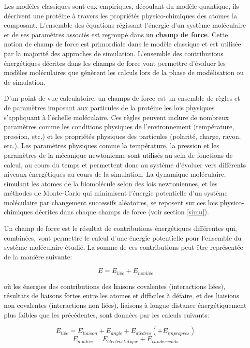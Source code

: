  \label{forcefield}

Les modèles classiques sont eux empiriques, découlant du modèle quantique, ils décrivent une protéine à travers les propriétés physico-chimiques des atomes la composant. L'ensemble des équations régissant l'énergie d'un système moléculaire et de ses paramètres associés est regroupé dans un \textbf{champ de force}. Cette notion de champ de force est primordiale dans le modèle classique et est utilisée par la majorité des approches de simulation. L'ensemble des contributions énergétiques décrites dans les champs de force vont permettre d'évaluer les modèles moléculaires que génèrent les calculs lors de la phase de modélisation ou de simulation.

D'un point de vue calculatoire, un champs de force est un ensemble de règles et de paramètres imposant aux particules de la protéine les lois physiques s'appliquant à l'échelle moléculaire. Ces règles peuvent inclure de nombreux paramètres comme les conditions physiques de l'environnement (température, pression, etc.) et les propriétés physiques des particules (polarité, charge, rayon, etc.). Les paramètres physiques comme la température, la pression et les paramètres de la mécanique newtonienne sont utilisés au sein de fonctions de calcul, au cours du temps et permettent donc au système d'évoluer vers différents niveaux énergétiques au cours de la simulation. La dynamique moléculaire, simulant les atomes de la biomolécule selon des lois newtoniennes, et les méthodes de Monte-Carlo qui minimisent l'énergie potentielle d'un système moléculaire par changement successifs aléatoires, se reposent sur ces lois physico-chimiques décrites dans chaque champs de force (voir section \ref{simu}). 

Un champ de force est le résultat de contributions énergétiques différentes qui, combinées, vont permettre le calcul d'une énergie potentielle pour l'ensemble du système moléculaire étudié. La somme de ces contributions peut être représentée de la manière suivante:

$$E = E_{liée} + E_{nonliée}$$

où les énergies des contributions des liaisons covalentes (interactions liées), résultats de liaisons fortes entre les atomes et difficiles à défaire, et des liaisions non covalentes (interactions non liées), liaisons à longue distance énergétiquement plus faibles que les précédentes, sont données par les calculs suivants:

$$E_{liée} = E_{liaison} + E_{angle} + E_{dièdres} (+ E_{impropres})$$
$$E_{nonliée} = E_{électrostatique} + E_{vanderwaals}$$

